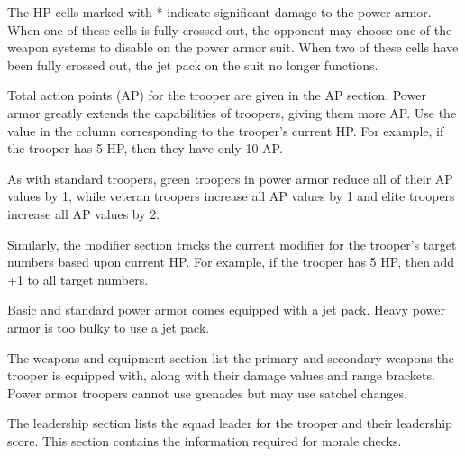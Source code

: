 The HP cells marked with * indicate significant damage to the power armor.
When one of these cells is fully crossed out, the opponent may choose one of the weapon systems to disable on the power armor suit.
When two of these cells have been fully crossed out, the jet pack on the suit no longer functions.

Total action points (AP) for the trooper are given in the AP section.
Power armor greatly extends the capabilities of troopers, giving them more AP.
Use the value in the column corresponding to the trooper's current HP.
For example, if the trooper has 5 HP, then they have only 10 AP.

As with standard troopers, green troopers in power armor reduce all of their AP values by 1, while veteran troopers increase all AP values by 1 and elite troopers increase all AP values by 2.

Similarly, the modifier section tracks the current modifier for the trooper's target numbers based upon current HP.
For example, if the trooper has 5 HP, then add +1 to all target numbers.

Basic and standard power armor comes equipped with a jet pack.
Heavy power armor is too bulky to use a jet pack.

The weapons and equipment section list the primary and secondary weapons the trooper is equipped with, along with their damage values and range brackets.
Power armor troopers cannot use grenades but may use satchel changes.

The leadership section lists the squad leader for the trooper and their leadership score.
This section contains the information required for morale checks.
